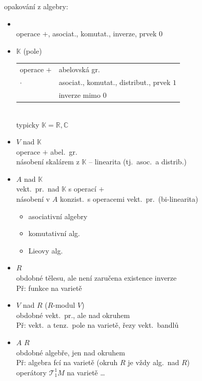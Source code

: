 opakování z algebry:
\begin{itemize}
  \item {} \\
        operace $+$, asociat., komutat., inverze, prvek $0$
  \item {} $\mathbb{K}$ (pole) \quad [field] \\
        \begin{tabular}{@{}ll}
          operace $+$ & abelovská gr. \\
          \phantom{operace} $\cdot$ & asociat., komutat., distribut., prvek $1$ \\
                                     & inverze mimo $0$
        \end{tabular} \\
        typicky $\mathbb{K} = \mathbb{R},\mathbb{C}$
  \item {} $V$ nad $\mathbb{K}$ \\
        operace $+$ \quad abel.\ gr. \\
        násobení skalárem z $\mathbb{K}$ \quad -- linearita (tj.\ asoc.\ a distrib.)
  \item {} $A$ nad $\mathbb{K}$ \\
        vekt.\ pr.\ nad $\mathbb{K}$ s operací $+$ \\
        násobení v $A$ konzist.\ s operacemi vekt.\ pr.\ (bi-linearita)
        \begin{itemize}[nosep]
          \item[-] asociativní algebry
          \item[-] komutativní alg.
          \item[-] Lieovy alg.
        \end{itemize}
  \item {} $R$ \\
        obdobné tělesu, ale není zaručena existence inverze \\
        Př: funkce na varietě
  \item {} $V$ nad $R$ \quad ($R$-modul $V$) \\
        obdobné vekt.\ pr., ale nad okruhem \\
        Př: vekt.\ a tenz.\ pole na varietě, řezy vekt.\ bandlů
  \item {} $A$   $R$ \\
        obdobné algebře, jen nad okruhem \\
        Př: algebra fcí na varietě \quad (okruh $R$ je vždy alg.\ nad $R$) \\
        \phantom{Př:} operátory $\mathcal{T}^1_1M$ na varietě \dots
\end{itemize}

